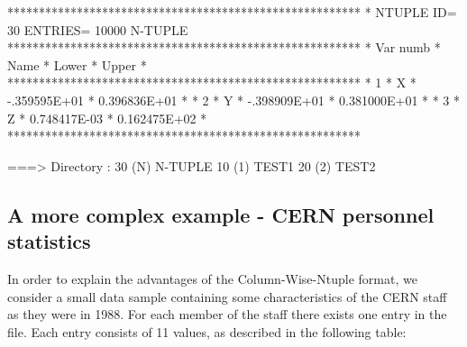 \begin{Listing}
 ********************************************************
 * NTUPLE ID=   30  ENTRIES=  10000   N-TUPLE 
 ********************************************************
 *  Var numb  *   Name    *    Lower     *    Upper     *
 ********************************************************
 *      1     *    X      * -.359595E+01 * 0.396836E+01 *
 *      2     *    Y      * -.398909E+01 * 0.381000E+01 *
 *      3     *    Z      * 0.748417E-03 * 0.162475E+02 *
 ********************************************************

 ===> Directory : 
         30 (N)   N-TUPLE 
         10 (1)   TEST1   
         20 (2)   TEST2   
\end{Listing}

\newpage    

\subsection*{A more complex example - CERN personnel statistics}
\label{sec:ntuplestaff}
 
In order to explain the advantages of the Column-Wise-Ntuple format,
we consider a small data sample containing some characteristics of the CERN
staff as they were in 1988.
For each member of the staff there exists one entry in the file. Each
entry consists of 11 values, as described in the following table:

